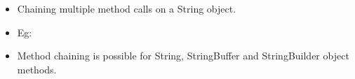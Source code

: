 \setlength{\columnsep}{3pt}
\begin{flushleft}
	
	\begin{itemize}
		\item Chaining multiple method calls on a String object.
		\item Eg:
		\bigskip
		\bigskip

		\item Method chaining is possible for String, StringBuffer and StringBuilder object methods.
		
			
	\end{itemize}
	
\end{flushleft}
\newpage


